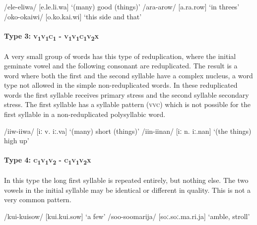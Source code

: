 \ea
\ea
/ele-eliwa/  [e.{{\textprimstress}}le.{{\textprimstress}}{{\textprimstress}}li.wa]  `(many) good (things)'
\ex
/ara-arow/  [a.{{\textprimstress}}ra.{{\textprimstress}}{{\textprimstress}}row]  `in threes'
\ex
/oko-okaiwi/  [o.{{\textprimstress}}ko.{{\textprimstress}}{{\textprimstress}}kai.wi]  `this side and that'
\z
\z

\paragraph{Type 3:  \textsc{v}\textsubscript{1}\textsc{v}\textsubscript{1}\textsc{c}\textsubscript{1} - \textsc{v}\textsubscript{1}\textsc{v}\textsubscript{1}\textsc{c}\textsubscript{1}\textsc{v}\textsubscript{2}\textsc{x}}\label{sec:2:a:z:y:x}

A very small group of words has this type of reduplication, where the initial geminate vowel and the following consonant are reduplicated.  The result is a word where both the first and the second syllable have a complex nucleus, a word type not allowed in the simple non-reduplicated words.  In these reduplicated words the first syllable receives primary stress and the second syllable secondary stress.  The first syllable has a syllable pattern (\textsc{vvc}) which is not possible for the first syllable in a non-reduplicated polysyllabic word.

\ea
\ea
/iiw-iiwa/  [{{\textprimstress}}iː v.{{\textprimstress}}{{\textprimstress}} iː.va]  `(many) short (things)'
\ex
/iin-iinan/  [{{\textprimstress}}iː n.{{\textprimstress}{{\textprimstress}} iː.nan}]  `(the things) high up'
\z
\z

\paragraph{Type 4:  \textsc{c}\textsubscript{1}\textsc{v}\textsubscript{1}\textsc{v}\textsubscript{2} - \textsc{c}\textsubscript{1}\textsc{v}\textsubscript{1}\textsc{v}\textsubscript{2}\textsc{x}}\label{sec:2:a:z:y:x}

In this type the long first syllable is repeated entirely, but nothing else.  The two vowels in the initial syllable may be identical or different in quality. This is not a very common pattern.

\ea
\ea
/kui-kuisow/  [{{\textprimstress}}kui.{{\textprimstress}}{{\textprimstress}}kui.sow]  `a few'
\ex
/soo-soomarija/  [{{\textprimstress}}soː.{{\textprimstress}}{{\textprimstress}}soː.ma.ri.ja]  `amble, stroll'
\z
\z

